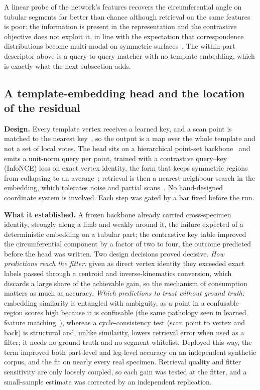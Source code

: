 A linear probe of the network's features recovers the circumferential angle on tubular
segments far better than chance although retrieval on the same features is poor: the
information is present in the representation and the contrastive objective does not exploit
it, in line with the expectation that correspondence distributions become multi-modal on
symmetric surfaces~\cite{haugaard}. The within-part descriptor above is a query-to-query
matcher with no template embedding, which is exactly what the next subsection adds.

\subsection{A template-embedding head and the location of the residual}
\label{sec:cse}

\textbf{Design.} Every template vertex receives a learned key, and a scan point is matched to the
nearest key~\cite{cse}, so the output is a map over the whole template and not a set of local
votes. The head sits on a hierarchical point-set backbone~\cite{pointnet2} and emits a unit-norm
query per point, trained with a contrastive query--key (InfoNCE) loss on exact vertex identity,
the form that keeps symmetric regions from collapsing to an average~\cite{haugaard}; retrieval is
then a nearest-neighbour search in the embedding, which tolerates noise and partial scans~\cite{coe}.
No hand-designed coordinate system is involved. Each step was gated by a bar fixed before the run.

\textbf{What it established.} A frozen backbone already carried cross-specimen identity, strongly
along a limb and weakly around it, the failure expected of a deterministic embedding on a tubular
part; the contrastive key table improved the
circumferential component by a factor of two to four, the outcome predicted before the head was
written. Two design decisions proved decisive. \emph{How predictions reach the fitter:} given
as direct vertex identity they exceeded exact labels passed through a centroid and
inverse-kinematics conversion, which discards a large share of the achievable gain, so the
mechanism of consumption matters as much as accuracy. \emph{Which predictions to trust without
ground truth:} embedding similarity is entangled with ambiguity, as a point in a confusable
region scores high because it is confusable (the same pathology seen in learned feature
matching~\cite{lightglue}), whereas a cycle-consistency test (scan
point to vertex and back) is structural and, unlike similarity, lowers retrieval error when
used as a filter; it needs no ground truth and no segment whitelist. Deployed this way, the
term improved both part-level and leg-level accuracy on an independent synthetic corpus, and the
fit on nearly every real specimen. Retrieval quality and fitter sensitivity are only loosely coupled, so each gain was tested at the
fitter, and a small-sample estimate was corrected by an independent replication.

